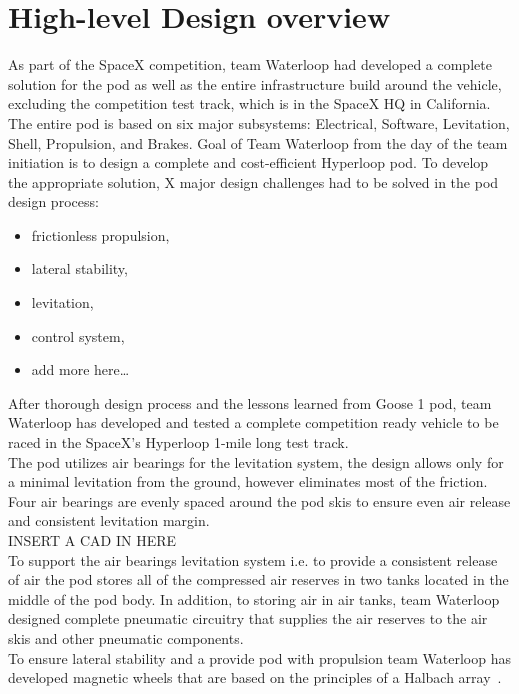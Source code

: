 \documentclass[11pt,a4paper,oldfontcommands]{memoir}
\begin{document}
\section{High-level Design overview}
As part of the SpaceX competition, team Waterloop had developed a complete solution for the pod as well as the entire infrastructure build around the vehicle, excluding the competition test track, which is in the SpaceX HQ in California.
The entire pod is based on six major subsystems: Electrical, Software, Levitation, Shell, Propulsion, and Brakes.
Goal of Team Waterloop from the day of the team initiation is to design a complete and cost-efficient Hyperloop pod. To develop the appropriate solution, X major design challenges had to be solved in the pod design process:
\begin{itemize}
 \item frictionless propulsion, 
 \item lateral stability, 
 \item levitation, 
 \item control system,
 \item add more here…
\end{itemize}
After thorough design process and the lessons learned from Goose 1 pod, team Waterloop has developed and tested a complete competition ready vehicle to be raced in the SpaceX’s Hyperloop 1-mile long test track. \\

The pod utilizes air bearings for the levitation system, the design allows only for a minimal levitation from the ground, however eliminates most of the friction. Four air bearings are evenly spaced around the pod skis to ensure even air release and consistent levitation margin.  \\

INSERT A CAD IN HERE\\

To support the air bearings levitation system i.e. to provide a consistent release of air the pod stores all of the compressed air reserves in two tanks located in the middle of the pod body. In addition, to storing air in air tanks, team Waterloop designed complete pneumatic circuitry that supplies the air reserves to the air skis and other pneumatic components.\\

To ensure lateral stability and a provide pod with propulsion team Waterloop has developed magnetic wheels that are based on the principles of a Halbach array~\cite{Halbach_Array}.
\end{document}
